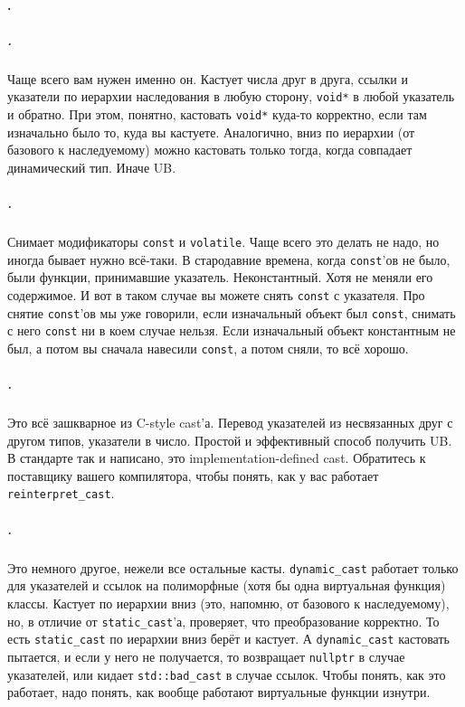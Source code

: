 \documentclass{article}
\begin{document}
    \paragraph{.}
    \subparagraph{.} Чаще всего вам нужен именно он. Кастует числа друг в друга, ссылки и указатели по иерархии наследования в любую сторону, \texttt{void*} в любой указатель и обратно. При этом, понятно, кастовать \texttt{void*} куда-то корректно, если там изначально было то, куда вы кастуете. Аналогично, вниз по иерархии (от базового к наследуемому) можно кастовать только тогда, когда совпадает динамический тип. Иначе UB.
    \subparagraph{.} Снимает модификаторы \texttt{const} и \texttt{volatile}. Чаще всего это делать не надо, но иногда бывает нужно всё-таки. В стародавние времена, когда \texttt{const}'ов не было, были функции, принимавшие указатель. Неконстантный. Хотя не меняли его содержимое. И вот в таком случае вы можете снять \texttt{const} с указателя. Про снятие \texttt{const}'ов мы уже говорили, если изначальный объект был \texttt{const}, снимать с него \texttt{const} ни в коем случае нельзя. Если изначальный объект константным не был, а потом вы сначала навесили \texttt{const}, а потом сняли, то всё хорошо.
    \subparagraph{.} Это всё зашкварное из C-style cast'а. Перевод указателей из несвязанных друг с другом типов, указатели в число. Простой и эффективный способ получить UB. В стандарте так и написано, это implementation-defined cast. Обратитесь к поставщику вашего компилятора, чтобы понять, как у вас работает \texttt{reinterpret_cast}.
    \subparagraph{.} Это немного другое, нежели все остальные касты. \texttt{dynamic_cast} работает только для указателей и ссылок на полиморфные (хотя бы одна виртуальная функция) классы. Кастует по иерархии вниз (это, напомню, от базового к наследуемому), но, в отличие от \texttt{static_cast}'а, проверяет, что преобразование корректно. То есть \texttt{static_cast} по иерархии вниз берёт и кастует. А \texttt{dynamic_cast} кастовать пытается, и если у него не получается, то возвращает \texttt{nullptr} в случае указателей, или кидает \texttt{std::bad_cast} в случае ссылок. Чтобы понять, как это работает, надо понять, как вообще работают виртуальные функции изнутри.
\end{document}
